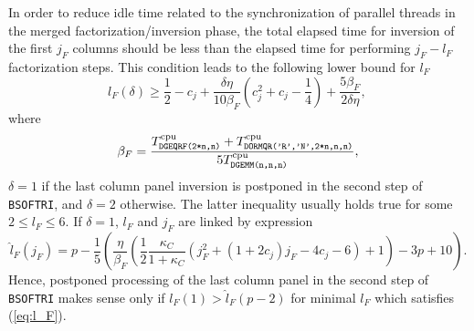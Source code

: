 \documentclass{llncs}
\newcommand{\Bsoftri}{\texttt{BSOFTRI}\xspace}
\begin{document}
In order to reduce idle time 
related to %
the synchronization of parallel threads 
in the merged factorization/inversion phase, 
the total elapsed time for inversion of the first $j_F$ columns %
should be less than 
the elapsed time for performing $j_F-l_F$ factorization steps.
This condition leads to the following lower bound for $l_F$
\begin{equation}
  \label{eq:l_F}
  l_{F}(\delta) \ge
  \frac{1}{2} - c_{j} + \frac{\delta \eta}{10 \beta_F } 
  \left( c_{j}^{2} + c_{j}  - \frac{1}{4} \right) + \frac{5 \beta_F }{2 \delta \eta}
  , \,
\end{equation}
where 
\begin{equation*}
  \beta_F  = \frac{T^{\rm cpu}_{\texttt{DGEQRF(2*n,n)}} + T^{\rm cpu}_{\texttt{DORMQR('R','N',2*n,n,n)}}}{5 T^{\rm cpu}_{\texttt{DGEMM(n,n,n)}}},
\end{equation*}
$\delta=1$ if the last column panel inversion 
is postponed in the second step of \Bsoftri,
and $\delta=2$ otherwise. 
The latter inequality usually holds true for some $2 \le l_F \le 6$.
If $\delta=1$, $l_F$ and $j_F$ are linked by expression
\begin{equation*}
  \label{eq:l_F2}
  \hat{l}_F(j_F) = p - {\frac{1}{5}\left(\frac{\eta}{\beta_{F} } 
      \left( \frac{1}{2}\frac{\kappa_{C}}{1+\kappa_{C}} 
        \left(j_F^2 + (1+2c_j)j_F  - 4 c_j - 6 \right) %
        + 1 \right) - 3 p +  10\right) }
  .
\end{equation*}
Hence, postponed processing of the last column panel in the second step of \Bsoftri 
makes sense only if $l_F(1) > \hat{l}_F(p-2)$
for minimal $l_F$ which satisfies (\ref{eq:l_F}).
\end{document}
